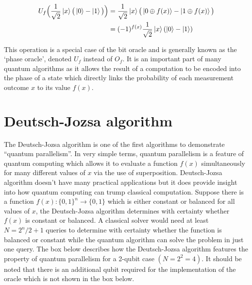 \begin{equation*}
\begin{split}
  U_f\Big(\frac{1}{\sqrt{2}}\left\vert{x}\right\rangle\big(\left\vert{0}\right\rangle-\left\vert{1}\right\rangle\big)\Big) &=\frac{1}{\sqrt{2}}\left\vert{x}\right\rangle\big(\left\vert{0\oplus f(x)}\right\rangle-\left\vert{1\oplus f(x)}\right\rangle\big)\\
  &= (-1)^{f(x)}\frac{1}{\sqrt{2}}\left\vert{x}\right\rangle(\left\vert{0}\right\rangle-\left\vert{1}\right\rangle) 
\end{split}
\end{equation*}

This operation is a special case of the bit oracle and is generally known as the `phase oracle', denoted $U_{f}$ instead of $O_{f}$. It is an important part of many quantum algorithms as it allows the result of a computation to be encoded into the phase of a state which directly links the probability of each measurement outcome $x$ to its value $f(x)$. 


\section{Deutsch-Jozsa algorithm}\label{Deutsch-Jozsa}


The Deutsch-Jozsa algorithm is one of the first algorithms to demonstrate ``quantum parallelism''. In very simple terms, quantum parallelism is a feature of quantum computing which allows it to evaluate a function $f(x)$ simultaneously for many different values of $x$ via the use of superposition. Deutsch-Jozsa algorithm doesn't have many practical applications but it does provide insight into how quantum computing can trump classical computation. Suppose there is a function $f(x): \{0,1\}^{n} \rightarrow \{0,1\}$ which is either constant or balanced for all values of $x$, the Deutsch-Jozsa algorithm determines with certainty whether $f(x)$ is constant or balanced. A classical solver would need at least $N=2^{n}/2+1$ queries to determine with certainty whether the function is balanced or constant while the quantum algorithm can solve the problem in just one query. The box below describes how the Deutsch-Jozsa algorithm features the property of quantum parallelism for a 2-qubit case $(N=2^{2}=4)$. It should be noted that there is an additional qubit required for the implementation of the oracle which is not shown in the box below.


